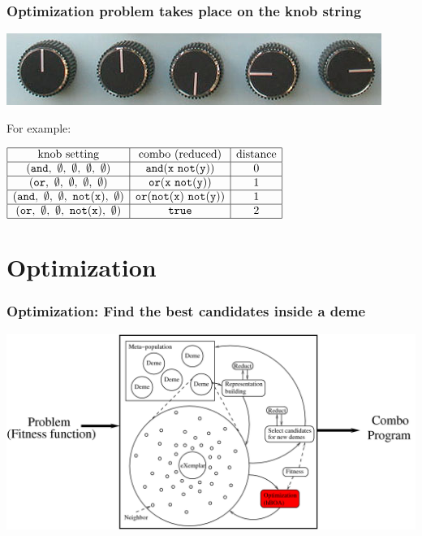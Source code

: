 \documentclass{beamer}
\begin{document}
\frame
{
  \frametitle{Optimization problem takes place on the knob string}

  \begin{center}
    \includegraphics[scale=0.3]{knobs.png}
  \end{center}
  For example:

  $
  \begin{array}{|c|c|c|}
    \hline
    {\text{knob setting}} & {\text{combo (reduced)}} & {\text{distance}}\\
    \hline
     {\tt (and,\ \emptyset,\ \emptyset,\ \emptyset,\ \emptyset)}
     &
     {\tt and(x\ not(y))}
     &
     0
     \\
    \hline
     {\tt (or,\ \emptyset,\ \emptyset,\ \emptyset,\ \emptyset)}
     &
     {\tt or(x\ not(y))}
     &
     1
     \\
     \hline
     {\tt (and,\ \emptyset,\ \emptyset,\ not(x),\ \emptyset)}
     &
     {\tt or(not(x)\ not(y))}
     &
     1
     \\
     \hline
     {\tt (or,\ \emptyset,\ \emptyset,\ not(x),\ \emptyset)}
     &
     {\tt true}
     &
     2
     \\
     \hline
  \end{array}
   $
   
}


\section{Optimization}

\frame
{
  \frametitle{Optimization: Find the best candidates inside a deme}

  \begin{center}
    
    \includegraphics[scale=0.2]{MOSESSumDetailsO.png}

  \end{center}  
}
\end{document}
